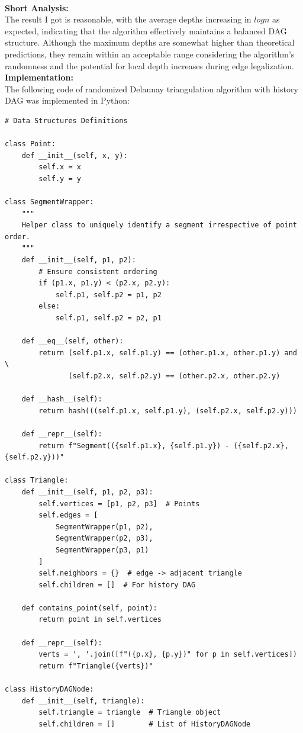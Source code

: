 \documentclass{article}
\begin{document}
\hspace{0.01cm}
\\
\textbf{Short Analysis: }
\\
The result I got is reasonable, with the average depths increasing in $log n$ as expected, indicating that the algorithm effectively maintains a balanced DAG structure. 
Although the maximum depths are somewhat higher than theoretical predictions, they remain within an acceptable range considering the algorithm's randomness and the potential for local depth increases during edge legalization. 
\\
\textbf{Implementation: }
\\
The following code of randomized Delaunay triangulation algorithm with history DAG was implemented in Python:
\begin{verbatim}
# Data Structures Definitions

class Point:
    def __init__(self, x, y):
        self.x = x
        self.y = y

class SegmentWrapper:
    """
    Helper class to uniquely identify a segment irrespective of point order.
    """
    def __init__(self, p1, p2):
        # Ensure consistent ordering
        if (p1.x, p1.y) < (p2.x, p2.y):
            self.p1, self.p2 = p1, p2
        else:
            self.p1, self.p2 = p2, p1

    def __eq__(self, other):
        return (self.p1.x, self.p1.y) == (other.p1.x, other.p1.y) and \
               (self.p2.x, self.p2.y) == (other.p2.x, other.p2.y)

    def __hash__(self):
        return hash(((self.p1.x, self.p1.y), (self.p2.x, self.p2.y)))

    def __repr__(self):
        return f"Segment(({self.p1.x}, {self.p1.y}) - ({self.p2.x}, {self.p2.y}))"

class Triangle:
    def __init__(self, p1, p2, p3):
        self.vertices = [p1, p2, p3]  # Points
        self.edges = [
            SegmentWrapper(p1, p2),
            SegmentWrapper(p2, p3),
            SegmentWrapper(p3, p1)
        ]
        self.neighbors = {}  # edge -> adjacent triangle
        self.children = []  # For history DAG

    def contains_point(self, point):
        return point in self.vertices

    def __repr__(self):
        verts = ', '.join([f"({p.x}, {p.y})" for p in self.vertices])
        return f"Triangle({verts})"

class HistoryDAGNode:
    def __init__(self, triangle):
        self.triangle = triangle  # Triangle object
        self.children = []        # List of HistoryDAGNode


\end{verbatim}
\end{document}
